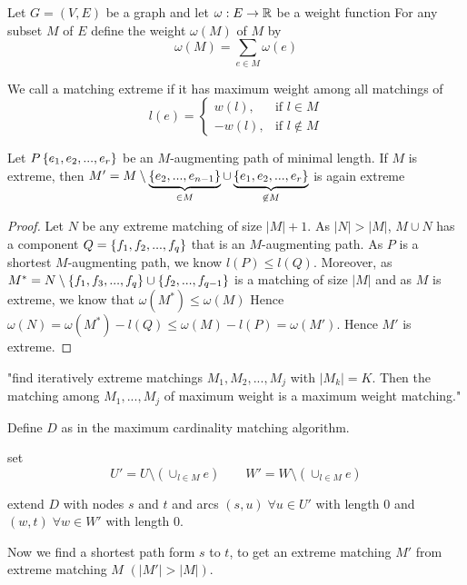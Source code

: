 Let $G=(V,E)$ be a graph and let $\omega: E \rightarrow \mathbb{R}$ be a weight function
For any subset $M$ of $E$ define the weight $\omega(M)$ of $M$ by \[
	\omega(M) = \sum\limits_{e \in M}\omega(e)
\]

\begin{defn+}
	We call a matching extreme if it has maximum weight among all matchings of 
	\[
		l(e) =
		\begin{cases}
			w(l), & \text{if } l\in M \\
			-w(l), & \text{if } l \not \in M
		\end{cases}
	\]	
\end{defn+}

\begin{lem}
	Let $P \left\{e_1, e_2, ..., e_r\right\}$ be an $M$-augmenting path of minimal length.
	If $M$ is extreme, then $M' = M \setminus \underbrace{\left\{e_2, ..., e_{n-1}\right\}}_{\in M} \cup \underbrace{\left\{e_1, e_2, ..., e_r\right\}}_{\not \in M}$ is again extreme
\end{lem}

\begin{proof}
	Let $N$ be any extreme matching of size $|M| + 1$. As $|N| > |M|$, $M \cup N$
	has a component $Q = \left\{f_1, f_2, ..., f_q\right\}$ that is an $M$-augmenting path.
	As $P$ is a shortest $M$-augmenting path, we know $l(P) \leq l(Q)$. Moreover,
	as $M^*=N\setminus \left\{f_1, f_3, ..., f_q\right\} \cup \left\{f_2, ..., f_{q-1}\right\}$ 
	is a matching of size $|M|$ and as $M$ is extreme, we know that $\omega(M^*) \leq \omega(M)$
	Hence $\omega(N) = \omega(M^*) - l(Q) \leq \omega (M) - l(P) = \omega(M')$.
	Hence $M'$ is extreme.
\end{proof}

"find iteratively extreme matchings $M_1, M_2, ..., M_j$ with $|M_k|=K$. Then the
matching among $M_1, ..., M_j$ of maximum weight is a maximum weight matching."

Define  $D$ as in the maximum cardinality matching algorithm.

set \[U'=U\setminus (\cup_{l\in M}e) \qquad W'=W\setminus ( \cup_{l \in M}e) \]

extend $D$ with nodes $s$ and $t$ and arcs $(s,u) \; \forall u \in U'$ with 
length $0$ and $(w,t) \; \forall w \in W'$ with length $0$.

Now we find a shortest path form $s$ to $t$, to get an extreme matching $M'$ 
from extreme matching $M$ $(|M'| > |M|)$.

